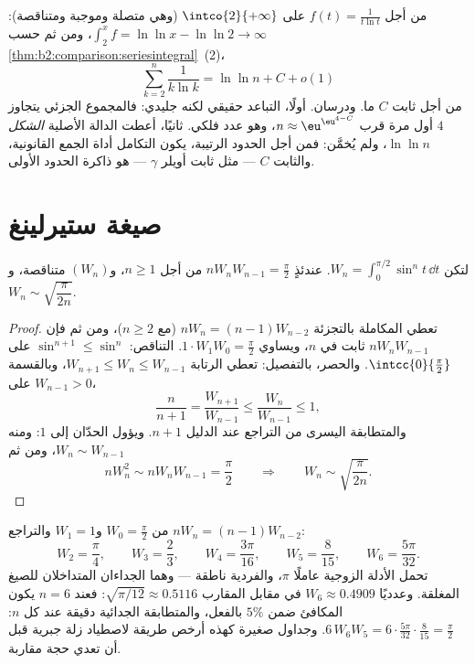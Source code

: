 \begin{example}\label{ex:b2:comparison:loglog}
من أجل $f(t) = \frac{1}{t\ln t}$ على $\intco{2}{+\infty}$
(وهي متصلة وموجبة ومتناقصة): $\int_2^x f = \ln\ln x -
\ln\ln 2 \to \infty$، ومن ثم حسب
\cref{thm:b2:comparison:seriesintegral}~(2)،
\[
\sum_{k=2}^{n}\frac{1}{k\ln k} = \ln\ln n + C + o(1)
\]
من أجل ثابت $C$ ما. ودرسان. أولًا، التباعد
حقيقي لكنه جليدي: فالمجموع الجزئي يتجاوز $4$ أول مرة قرب $n
\approx \eu^{\eu^{4 - C}}$، وهو عدد فلكي. ثانيًا، أعطت الدالة الأصلية
\emph{الشكل} $\ln\ln n$، ولم يُخمَّن: فمن أجل الحدود الرتيبة،
يكون التكامل أداة الجمع القانونية، والثابت $C$ --- مثل ثابت أويلر $\gamma$
--- هو ذاكرة الحدود الأولى.
\end{example}

\section{صيغة ستيرلينغ}

\begin{lemma}\label{lem:b2:comparison:wallis}
لتكن $W_n = \int_0^{\pi/2} \sin^n t\,\dd t$. عندئذٍ $nW_nW_{n-1} =
\frac\pi2$ من أجل $n \geq 1$، و$(W_n)$ متناقصة، و$W_n \sim
\sqrt{\dfrac{\pi}{2n}}$.
\end{lemma}

\begin{proof}
تعطي المكاملة بالتجزئة $nW_n = (n-1)W_{n-2}$ (مع $n \geq 2$)، ومن ثم فإن
$nW_nW_{n-1}$ ثابت في $n$، ويساوي $1 \cdot W_1 W_0 =
\frac\pi2$. التناقص: $\sin^{n+1} \leq \sin^n$ على
$\intcc{0}{\frac\pi2}$. والحصر، بالتفصيل: تعطي الرتابة
$W_{n+1} \leq W_n \leq W_{n-1}$، وبالقسمة على $W_{n-1}
> 0$،
\[
\frac{n}{n+1} = \frac{W_{n+1}}{W_{n-1}} \leq
\frac{W_n}{W_{n-1}} \leq 1 ,
\]
والمتطابقة اليسرى من التراجع عند الدليل $n + 1$. ويؤول
الحدّان إلى $1$: ومنه $W_n \sim W_{n-1}$، ومن ثم
\[
nW_n^2 \sim nW_nW_{n-1} = \frac\pi2
\qquad\Longrightarrow\qquad
W_n \sim \sqrt{\frac{\pi}{2n}} .
\]
\end{proof}

\begin{example}\label{ex:b2:comparison:wallisvalues}
من $W_0 = \frac\pi2$ و$W_1 = 1$ والتراجع $nW_n =
(n-1)W_{n-2}$:
\[
W_2 = \frac\pi4, \qquad
W_3 = \frac23, \qquad
W_4 = \frac{3\pi}{16}, \qquad
W_5 = \frac{8}{15}, \qquad
W_6 = \frac{5\pi}{32}.
\]
تحمل الأدلة الزوجية عاملًا $\pi$، والفردية ناطقة --- وهما الجداءان
المتداخلان للصيغ المغلقة. وعدديًا $W_6
\approx 0.4909$ في مقابل المقارب
$\sqrt{\pi/12} \approx 0.5116$: فعند $n = 6$ يكون المكافئ
ضمن $5\%$ بالفعل، والمتطابقة الجدائية دقيقة عند كل
$n$: $6\,W_6W_5 = 6\cdot\frac{5\pi}{32}\cdot\frac8{15} =
\frac\pi2$. وجداول صغيرة كهذه أرخص طريقة
لاصطياد زلة جبرية قبل أن تعدي حجة مقاربة.
\end{example}

